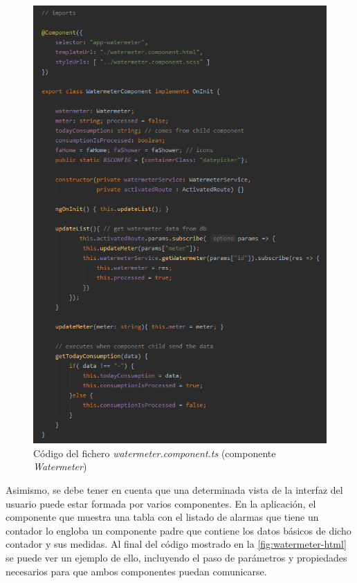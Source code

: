 \documentclass[pdftex,11pt,a4paper]{book}
\begin{document}
 \begin{figure}[h]
 \centering
 \includegraphics [scale=0.70] {images/implementacion/watermeter-ts.png}
 \caption{Código del fichero \textit{watermeter.component.ts} (componente \textit{Watermeter})} \label{fig:watermeter-ts}
 \end{figure}

Asimismo, se debe tener en cuenta que una determinada vista de la interfaz del usuario puede estar formada por varios componentes. En la aplicación, el componente que muestra una tabla con el listado de alarmas que tiene un contador lo engloba un componente padre que contiene los datos básicos de dicho contador y sus medidas. Al final del código mostrado en la \ref{fig:watermeter-html} se puede ver un ejemplo de ello, incluyendo el paso de parámetros y propiedades necesarios para que ambos componentes puedan comunicarse. 
\end{document}
